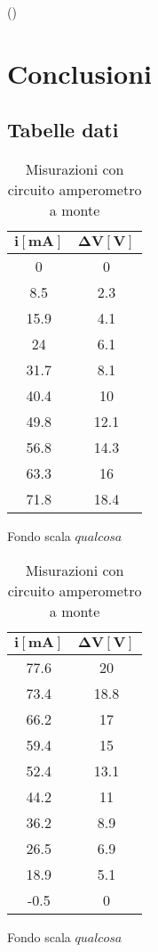 \documentclass[12pt]{article}
\begin{document}
()



\section{Conclusioni}
\newpage
\begin{appendices}
\section{Tabelle dati}
\begin{table}[H]
\centering

  \begin{subtable}{.5\textwidth}
    \centering
    \begin{tabular}{|c|c|} \hline
     $\mathbf{i {[mA]}}$  & $\mathbf{\Delta V [V]}$  \\ \hline
      0 & 0  \\ \hline
      8.5 & 2.3  \\ \hline
      15.9 & 4.1  \\ \hline
      24 & 6.1  \\ \hline
      31.7 & 8.1  \\ \hline
      40.4 & 10  \\ \hline
      49.8 & 12.1  \\ \hline
      56.8 & 14.3  \\ \hline
      63.3 & 16  \\ \hline
      71.8 & 18.4  \\ \hline
    \end{tabular}
    \caption{Fondo scala $qualcosa$}
  \end{subtable}%
  \begin{subtable}{.5\textwidth}
  \centering
  \begin{tabular}{|c|c|} \hline
  $\mathbf{i {[mA]}}$  & $\mathbf{\Delta V [V]}$  \\ \hline
    77.6 & 20  \\ \hline
    73.4 & 18.8  \\ \hline
    66.2 & 17  \\ \hline
    59.4 & 15  \\ \hline
    52.4 & 13.1  \\ \hline
    44.2 & 11  \\ \hline
    36.2 & 8.9  \\ \hline
    26.5 & 6.9  \\ \hline
    18.9 & 5.1  \\ \hline
    -0.5 & 0  \\ \hline
  \end{tabular}
  \caption{Fondo scala $qualcosa$}
\end{subtable}
\caption{Misurazioni con circuito amperometro a monte}
\end{table}
\begin{table}[H]
\centering


\end{table}
\end{appendices}
\end{document}

